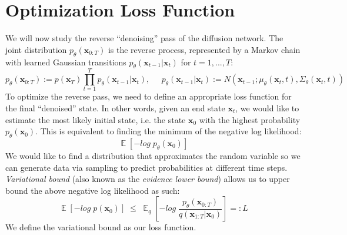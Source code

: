 \documentclass{article}
\DeclareMathOperator{\EX}{\mathbb{E}}%
\begin{document}
\section{Optimization Loss Function}
We will now study the reverse ``denoising'' pass of the diffusion network. The joint distribution $p_{\theta}(\textbf{x}_{0:T})$ is the reverse process, represented by a Markov chain with learned Gaussian transitions $p_{\theta}(\textbf{x}_{t-1}|\textbf{x}_t)$ for $t = 1, ..., T$:
\begin{equation}
    p_{\theta}(\textbf{x}_{0:T}) := p(\textbf{x}_{T})\prod_{t=1}^{T} p_{\theta}(\textbf{x}_{t-1}|\textbf{x}_{t}),\;\;\;\;\;p_{\theta}(\textbf{x}_{t-1}|\textbf{x}_{t}) := N(\textbf{x}_{t-1}; {\mu}_{\theta}(\textbf{x}_t, t), {\Sigma}_{\theta}(\textbf{x}_t, t))
\end{equation}
To optimize the reverse pass, we need to define an appropriate loss function for the final ``denoised'' state. In other words, given an end state $\textbf{x}_{t}$, we would like to estimate the most likely initial state, i.e. the state $\textbf{x}_0$ with the highest probability $p_{\theta}(\textbf{x}_0)$. This is equivalent to finding the minimum of the negative log likelihood:
\begin{equation}
    \EX[-log \; p_{\theta}(\textbf{x}_0)]
\end{equation}
We would like to find a distribution that approximates the random variable so we can generate data via sampling to predict probabilities at different time steps. \textit{Variational bound} (also known as the \textit{evidence lower bound}) allows us to upper bound the above negative log likelihood as such:
\begin{equation}
    \EX\left[-log \; p(\textbf{x}_0)\right] \; \leq \; \EX_q\left[-log \; \frac{p_{\theta}(\textbf{x}_{0:T})}{q(\textbf{x}_{1:T}|\textbf{x}_0)}\right] =: L
\end{equation}
We define the variational bound as our loss function. 
\end{document}
